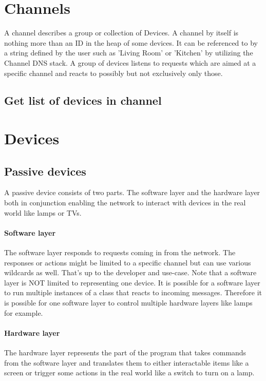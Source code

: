 \documentclass[a4paper]{article}
\begin{document}
	\section{Channels}
	    A channel describes a group or collection of Devices. A channel by itself is nothing more than an ID in the
	    heap of some devices. It can be referenced to by a string defined by the user such as 'Living Room' or 'Kitchen'
	    by utilizing the Channel DNS stack. A group of devices listens to requests which are aimed at a specific channel
	    and reacts to possibly but not exclusively only those.
	    \subsection{Get list of devices in channel}
	\section{Devices}
	    \subsection{Passive devices}
            A passive device consists of two parts. The software layer and the hardware layer both in conjunction
            enabling the network to interact with devices in the real world like lamps or TVs.
            \paragraph{Software layer} The software layer responds to requests coming in from the network. The responses
                or actions might be limited to a specific channel but can use various wildcards as well. That's up to
                the developer and use-case. Note that a software layer is NOT limited to representing one device. It is
                possible for a software layer to run multiple instances of a class that reacts to incoming messages.
                Therefore it is possible for one software layer to control multiple hardware layers
                like lamps for example.

            \paragraph{Hardware layer} The hardware layer represents the part of the program that takes commands from
                the software layer and translates them to either interactable items like a screen or trigger some
                actions in the real world like a switch to turn on a lamp.
\end{document}
